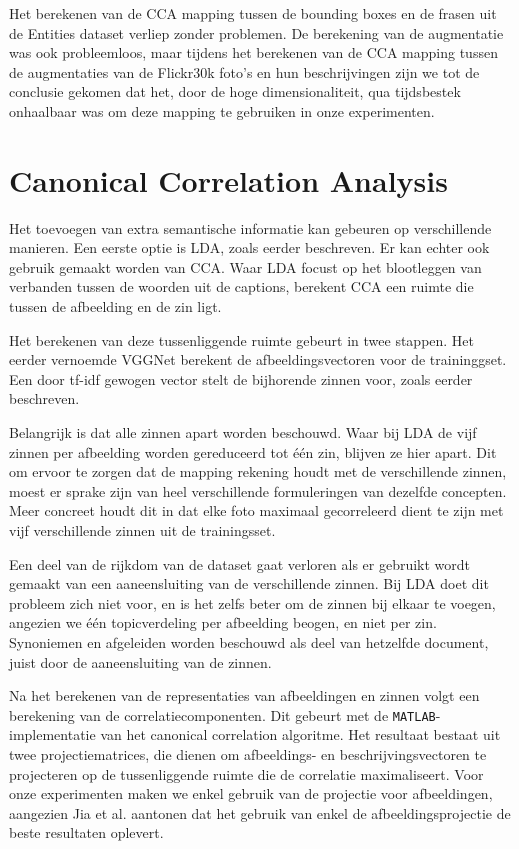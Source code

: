 Het berekenen van de CCA mapping tussen de bounding boxes en de frasen uit de Entities dataset verliep zonder problemen. De berekening van de augmentatie was ook probleemloos, maar tijdens het berekenen van de CCA mapping tussen de augmentaties van de Flickr30k foto's en hun beschrijvingen zijn we tot de conclusie gekomen dat het, door de hoge dimensionaliteit, qua tijdsbestek onhaalbaar was om deze mapping te gebruiken in onze experimenten. 



\section{Canonical Correlation Analysis}
Het toevoegen van extra semantische informatie kan gebeuren op verschillende manieren. Een eerste optie is LDA, zoals eerder beschreven. Er kan echter ook gebruik gemaakt worden van CCA. Waar LDA focust op het blootleggen van verbanden tussen de woorden uit de captions, berekent CCA een ruimte die tussen de afbeelding en de zin ligt.

Het berekenen van deze tussenliggende ruimte gebeurt in twee stappen. Het eerder vernoemde VGGNet berekent de afbeeldingsvectoren voor de traininggset. Een door tf-idf gewogen vector stelt de bijhorende zinnen voor, zoals eerder beschreven. 

Belangrijk is dat alle zinnen apart worden beschouwd. Waar bij LDA de vijf zinnen per afbeelding worden gereduceerd tot \'e\'en zin, blijven ze hier apart. Dit om ervoor te zorgen dat de mapping rekening houdt met de verschillende zinnen, moest er sprake zijn van heel verschillende formuleringen van dezelfde concepten. Meer concreet houdt dit in dat elke foto maximaal gecorreleerd dient te zijn met vijf verschillende zinnen uit de trainingsset. 

Een deel van de rijkdom van de dataset gaat verloren als er gebruikt wordt gemaakt van een aaneensluiting van de verschillende zinnen. Bij LDA doet dit probleem zich niet voor, en is het zelfs beter om de zinnen bij elkaar te voegen, angezien we \'e\'en topicverdeling per afbeelding beogen, en niet per zin. Synoniemen en afgeleiden worden beschouwd als deel van hetzelfde document, juist door de aaneensluiting van de zinnen.

Na het berekenen van de representaties van afbeeldingen en zinnen volgt een berekening van de correlatiecomponenten. Dit gebeurt met de \texttt{MATLAB}-implementatie van het canonical correlation algoritme. Het resultaat bestaat uit twee projectiematrices, die dienen om afbeeldings- en beschrijvingsvectoren te projecteren op de tussenliggende ruimte die de correlatie maximaliseert. Voor onze experimenten maken we enkel gebruik van de projectie voor afbeeldingen, aangezien Jia et al.\cite{Fernando2015} aantonen dat het gebruik van enkel de afbeeldingsprojectie de beste resultaten oplevert.


